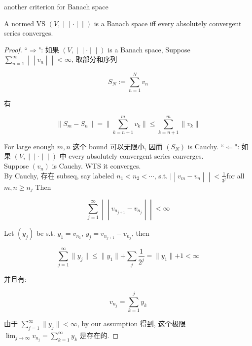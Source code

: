 \documentclass{qlnotes-export}
\begin{document}
\begin{theorem}{another criterion for Banach space}\label{thm-09-l-p-space-and-inequalities-another-criterion-for-banach-space}

A normed VS \(\left. (V, \middle| \middle| \cdot \middle| \middle| ) \right.\) is a Banach space iff every absolutely convergent series converges.

\end{theorem}

\begin{proof}

``\(\Longrightarrow\)": 如果 \(\left. (V, \middle| \middle| \cdot \middle| \middle| ) \right.\) is a Banach space, Suppose \(\left. \sum_{n = 1}^{\infty} \middle| \middle| v_{n} \middle| \middle| < \infty \right.\), 取部分和序列

\[S_{N} := \sum\limits_{n = 1}^{N}v_{n}\]

有

\[\parallel S_{m} - S_{n} \parallel = \parallel \sum\limits_{k = n + 1}^{m}v_{k} \parallel \leq \sum\limits_{k = n + 1}^{m} \parallel v_{k} \parallel\]

For large enough \(m,n\) 这个 bound 可以无限小, 因而 \((S_{N})\) is Cauchy. ``\(\Longleftarrow\)": 如果 \(\left. (V, \middle| \middle| \cdot \middle| \middle| ) \right.\) 中 every absolutely convergent series converges.\\
Suppose \((v_{n})\) is Cauchy. WTS it converges.\\
By Cauchy, 存在 subseq, say labeled \(n_{1} < n_{2} < \cdots\), s.t. \(\left. | \middle| v_{m} - v_{n} \middle| \middle| < \frac{1}{3^{j}} \right.\)for all \(m,n \geq n_{j}\) Then

\[\left. \sum\limits_{j = 1}^{\infty} \middle| \middle| v_{n_{j + 1}} - v_{n_{j}} \middle| \middle| < \infty \right.\]

Let \((y_{j})\) be s.t. \(y_{1} = v_{n_{1}}\), \(y_{j} = v_{n_{j + 1}} - v_{n_{j}}\), then

\[\sum\limits_{j = 1}^{\infty} \parallel y_{j} \parallel \leq \parallel y_{1} \parallel + \sum\limits_{j}\frac{1}{2^{j}} = \parallel y_{1} \parallel + 1 < \infty\]

并且有:

\[v_{n_{j}} = \sum\limits_{k = 1}^{j}y_{k}\]

由于 \(\sum_{j = 1}^{\infty} \parallel y_{j} \parallel < \infty\), by our assumption 得到, 这个极限 \(\lim_{j\rightarrow\infty}v_{n_{j}} = \sum_{k = 1}^{\infty}y_{k}\) 是存在的.

\end{proof}
\end{document}
